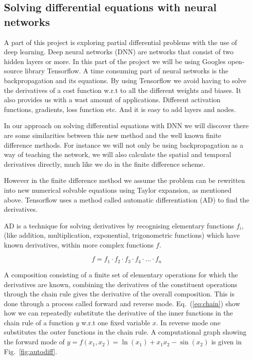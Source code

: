 \documentclass[a4paper, twocolumn]{article}
\newcommand{\fig}[1]{Fig.\ \ref{fig:#1}}
\newcommand{\eq} [1]{Eq.\ (\ref{eq:#1})}
\begin{document}
\subsection{Solving differential equations with neural networks}
A part of this project is exploring partial differential problems with the use of deep learning. Deep neural networks (DNN) are networks that consist of two hidden layers or more. In this part of the project we will be using Googles open-source library Tensorflow. A time consuming part of neural networks is the backpropagation and its equations. By using Tensorflow we avoid having to solve the derivatives of a cost function w.r.t to all the different weights and biases. It also provides us with a wast amount of applications. Different activation functions, gradients, loss function etc. And it is easy to add layers and nodes. 

In our approach on solving differential equations with DNN we will discover there are some similarities between this new method and the well known finite difference methods. For instance we will not only be using backpropagation as a way of teaching the network, we will also calculate the spatial and temporal derivatives directly, much like we do in the finite difference scheme.

However in the finite difference method we assume the problem can be rewritten into new numerical solvable equations using Taylor expansion, as mentioned above. Tensorflow uses a method called automatic differentiation (AD) to find the derivatives. 

AD is a technique for solving derivatives by recognising elementary functions $f_i$, (like addition, multiplication, exponential, trigonometric functions) which have known derivatives, within more complex functions $f$.  

\begin{equation}
f = f_1 \cdot f_2 \cdot f_3 \cdot f_4 \cdot ... \cdot f_n
\end{equation}

A composition consisting of a finite set of elementary operations for which the derivatives are known, combining the derivatives of the constituent operations through the chain rule gives the derivative of the overall composition. This is done through a process called forward and reverse mode. \eq{chain} show how we can repeatedly substitute the derivative of the inner functions in the chain rule of a function $y$ w.r.t one fixed variable $x$. In reverse mode one substitutes the outer functions in the chain rule. A computational graph showing the forward mode of $y = f(x_1, x_2) = \ln (x_1) + x_1 x_2 - \sin (x_2)$ is given in \fig{autodiff}.
\end{document}
